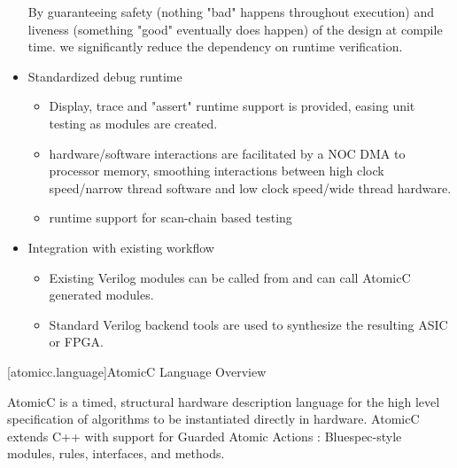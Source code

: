 \begin{itemize}
By guaranteeing
safety (nothing "bad" happens throughout execution)
and liveness (something "good" eventually does happen) of the design at compile time.
we significantly reduce the dependency on runtime verification.

\item Standardized debug runtime
\begin{itemize}
\item Display, trace and "assert" runtime support is provided, easing unit testing
as modules are created.
\item hardware/software interactions are facilitated by a NOC DMA to processor memory,
smoothing interactions between high clock speed/narrow thread software and low clock
speed/wide thread hardware.
\item runtime support for scan-chain based testing
\end{itemize}
\item Integration with existing workflow
\begin{itemize}
\item Existing Verilog modules can be called from and can call AtomicC generated modules.
\item Standard Verilog backend tools are used to synthesize the resulting ASIC or FPGA.
\end{itemize}
\end{itemize}

[atomicc.language]{AtomicC Language Overview}

AtomicC is a timed, structural hardware description language for
the high level specification of algorithms to be instantiated
directly in hardware.
AtomicC extends C++
with support for Guarded Atomic Actions
\cite{Hoe:Thesis,HoeArvind:TRSSynthesis2,Dave2007}:
Bluespec-style\cite{Bluespec:www}
modules, rules, interfaces, and methods.


